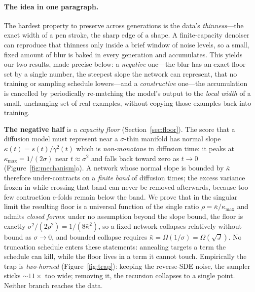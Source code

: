 \documentclass[11pt]{article}
\theoremstyle{remark}
\newcommand{\kb}{\bar\kappa}
\newcommand{\sigsq}{\sigma^2}
\begin{document}
\paragraph{The idea in one paragraph.} The hardest property to preserve across generations
is the data's \emph{thinness}---the exact width of a pen stroke, the sharp edge of a shape.
A finite-capacity denoiser can reproduce that thinness only inside a brief window of noise
levels, so a small, fixed amount of blur is baked in every generation and accumulates. This
yields our two results, made precise below: a \emph{negative} one---the blur has an exact
floor set by a single number, the steepest slope the network can represent, that no training
or sampling schedule lowers---and a \emph{constructive} one---the accumulation is cancelled
by periodically re-matching the model's output to the \emph{local width} of a small,
unchanging set of real examples, without copying those examples back into training.

\textbf{The negative half} is a \emph{capacity floor} (Section~\ref{sec:floor}). The
score that a diffusion model must represent near a $\sigma$-thin manifold has normal
slope $\kappa(t)=s(t)/\gamma^2(t)$ which is \emph{non-monotone} in diffusion time: it
peaks at $\kappa_{\max}=1/(2\sigma)$ near $t\approx\sigsq$ and falls back toward zero as
$t\to0$ (Figure~\ref{fig:mechanism}a). A network whose normal slope is bounded by $\kb$
therefore under-contracts on a \emph{finite band} of diffusion times; the excess variance
frozen in while crossing that band can never be removed afterwards, because too few
contraction e-folds remain below the band. We prove that in the singular limit the
resulting floor is a universal function of the single ratio $\rho=\kb/\kappa_{\max}$ and
admits \emph{closed forms}: under no assumption beyond the slope bound, the floor is
exactly $\sigsq/(2\rho^2)=1/(8\kb^2)$, so a fixed network collapses relatively without
bound as $\sigma\to0$, and bounded collapse requires $\kb=\Omega(1/\sigma)=\Omega(\sqrt J)$.
No truncation schedule enters these statements: annealing targets a term the schedule can
kill, while the floor lives in a term it cannot touch. Empirically the trap is
\emph{two-horned} (Figure~\ref{fig:trap}): keeping the reverse-SDE noise, the sampler
sticks $\sim\!11\times$ too wide; removing it, the recursion collapses to a single point.
Neither branch reaches the data.
\end{document}
